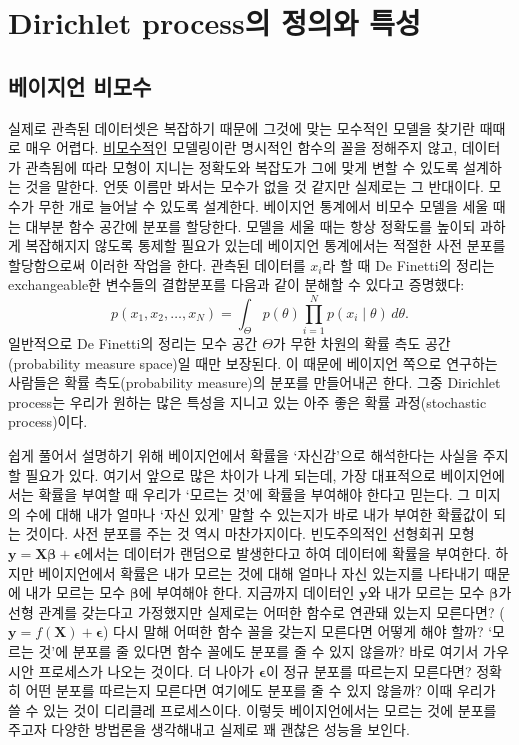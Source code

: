 \documentclass[a4paper, 10pt]{book}
\newcommand{\bs}{\boldsymbol}
\begin{document}
\nocite{*}

\chapter{Dirichlet process의 정의와 특성}

\section{베이지언 비모수}
  실제로 관측된 데이터셋은 복잡하기 때문에 그것에 맞는 모수적인 모델을 찾기란 때때로 매우 어렵다. \underline{비모수적}인 모델링이란 명시적인 함수의 꼴을 정해주지 않고, 데이터가 관측됨에 따라 모형이 지니는 정확도와 복잡도가 그에 맞게 변할 수 있도록 설계하는 것을 말한다. 언뜻 이름만 봐서는 모수가 없을 것 같지만 실제로는 그 반대이다. 모수가 무한 개로 늘어날 수 있도록 설계한다. 베이지언 통계에서 비모수 모델을 세울 때는 대부분 함수 공간에 분포를 할당한다. 모델을 세울 때는 항상 정확도를 높이되 과하게 복잡해지지 않도록 통제할 필요가 있는데 베이지언 통계에서는 적절한 사전 분포를 할당함으로써 이러한 작업을 한다. 관측된 데이터를 $x_{i}$라 할 때 De Finetti의 정리는 exchangeable한 변수들의 결합분포를 다음과 같이 분해할 수 있다고 증명했다:
  $$
    p\left(x_{1},x_{2},\ldots,x_{N}\right) = \int_{\Theta}p\left(\theta\right)\prod_{i=1}^{N}p\left(x_{i}\middle|\theta\right)\,d\theta.
  $$
  일반적으로 De Finetti의 정리는 모수 공간 $\Theta$가 무한 차원의 확률 측도 공간(probability measure space)일 때만 보장된다. 이 때문에 베이지언 쪽으로 연구하는 사람들은 확률 측도(probability measure)의 분포를 만들어내곤 한다. 그중 Dirichlet process는 우리가 원하는 많은 특성을 지니고 있는 아주 좋은 확률 과정(stochastic process)이다. \par
  쉽게 풀어서 설명하기 위해 베이지언에서 확률을 `자신감'으로 해석한다는 사실을 주지할 필요가 있다. 여기서 앞으로 많은 차이가 나게 되는데, 가장 대표적으로 베이지언에서는 확률을 부여할 때 우리가 `모르는 것'에 확률을 부여해야 한다고 믿는다. 그 미지의 수에 대해 내가 얼마나 `자신 있게' 말할 수 있는지가 바로 내가 부여한 확률값이 되는 것이다. 사전 분포를 주는 것 역시 마찬가지이다. 빈도주의적인 선형회귀 모형 $\bs{y} = \bs{X\beta} + \bs{\epsilon}$에서는 데이터가 랜덤으로 발생한다고 하여 데이터에 확률을 부여한다. 하지만 베이지언에서 확률은 내가 모르는 것에 대해 얼마나 자신 있는지를 나타내기 때문에 내가 모르는 모수 $\bs{\beta}$에 부여해야 한다. 지금까지 데이터인 $\bs{y}$와 내가 모르는 모수 $\bs{\beta}$가 선형 관계를 갖는다고 가정했지만 실제로는 어떠한 함수로 연관돼 있는지 모른다면? ($\bs{y}=f\left(\bs{X}\right) +\bs{\epsilon}$)  다시 말해 어떠한 함수 꼴을 갖는지 모른다면 어떻게 해야 할까? `모르는 것'에 분포를 줄 있다면 함수 꼴에도 분포를 줄 수 있지 않을까? 바로 여기서 가우시안 프로세스가 나오는 것이다. 더 나아가 $\bs{\epsilon}$이 정규 분포를 따르는지 모른다면? 정확히 어떤 분포를 따르는지 모른다면 여기에도 분포를 줄 수 있지 않을까? 이때 우리가 쓸 수 있는 것이 디리클레 프로세스이다. 이렇듯 베이지언에서는 모르는 것에 분포를 주고자 다양한 방법론을 생각해내고 실제로 꽤 괜찮은 성능을 보인다.
\end{document}
